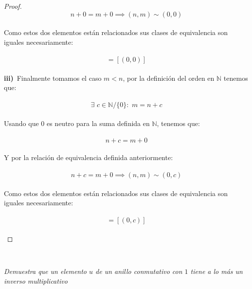 \documentclass[11pt,letterpaper]{article}
\newcommand{\N}{\mathbb{N}}
\begin{document}
\begin{proof}
    \begin{equation*}
        n+0=m+0\implies (n,m)\sim(0,0)
    \end{equation*}\,\\
    Como estos dos elementos est\'an relacionados sus clases de equivalencia son iguales necesariamente:\,\\
    \,\\
    \begin{equation*}
        [(n,m)]=[(0,0)]
    \end{equation*}\,\\
    \textbf{iii)}\,\,\,Finalmente tomamos el caso $m<n$, por la definici\'on del orden en $\N$ tenemos que:\,\\
    \,\\
    \begin{equation*}
        \exists\,\,c\in \N/\{0\}:\,\,m=n+c
    \end{equation*}\,\\
    Usando que $0$ es neutro para la suma definida en $\N$, tenemos que:\,\\
    \,\\
    \begin{equation*}
    n+c=m+0
    \end{equation*}\,\\
    Y por la relaci\'on de equivalencia definida anteriormente:\,\\
    \,\\
    \begin{equation*}
        n+c=m+0\implies (n,m)\sim(0,c)
    \end{equation*}\,\\
    Como estos dos elementos est\'an relacionados sus clases de equivalencia son iguales necesariamente:\,\\
    \,\\
    \begin{equation*}
        [(n,m)]=[(0,c)]
    \end{equation*}\,\\
\end{proof}\,\\
\newpage
\begin{tcolorbox}[
	title = \textcolor{black}{\textcolor{white}{Problema 3}},]
\textit{Demuestra que un elemento $u$ de un anillo conmutativo con $1$ tiene a lo m\'as un inverso multiplicativo
}
\end{tcolorbox}\,\\
\end{document}

